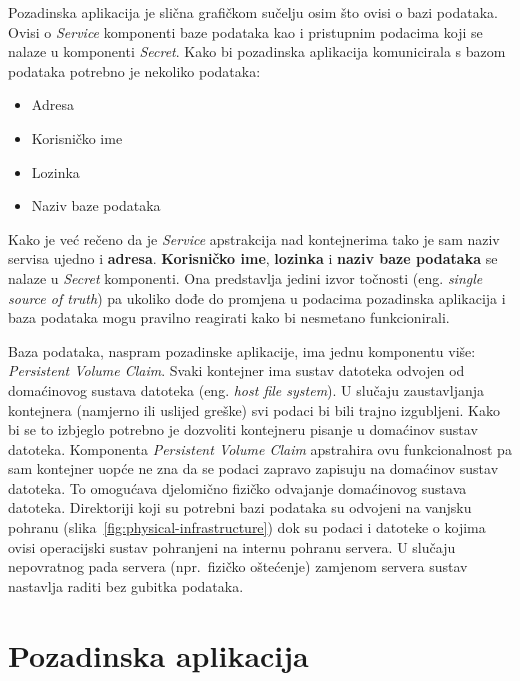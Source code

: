 Pozadinska aplikacija je slična grafičkom sučelju osim što ovisi o bazi podataka.
Ovisi o \textit{Service} komponenti baze podataka kao i pristupnim podacima koji se nalaze u komponenti \textit{Secret}.
Kako bi pozadinska aplikacija komunicirala s bazom podataka potrebno je nekoliko podataka:
\begin{itemize}
    \item Adresa
    \item Korisničko ime
    \item Lozinka
    \item Naziv baze podataka
\end{itemize}

Kako je već rečeno da je \textit{Service} apstrakcija nad kontejnerima tako je sam naziv servisa ujedno i \textbf{adresa}.
\textbf{Korisničko ime}, \textbf{lozinka} i \textbf{naziv baze podataka} se nalaze u \textit{Secret} komponenti.
Ona predstavlja jedini izvor točnosti (eng. \textit{single source of truth}) pa ukoliko dođe do promjena
u podacima pozadinska aplikacija i baza podataka mogu pravilno reagirati kako bi nesmetano funkcionirali.

Baza podataka, naspram pozadinske aplikacije, ima jednu komponentu više: \textit{Persistent Volume Claim}.
Svaki kontejner ima sustav datoteka odvojen od domaćinovog sustava datoteka (eng. \textit{host file system}).
U slučaju zaustavljanja kontejnera (namjerno ili uslijed greške) svi podaci bi bili trajno izgubljeni.
Kako bi se to izbjeglo potrebno je dozvoliti kontejneru pisanje u domaćinov sustav datoteka.
Komponenta \textit{Persistent Volume Claim} apstrahira ovu funkcionalnost pa sam kontejner uopće ne zna da se podaci zapravo
zapisuju na domaćinov sustav datoteka.
To omogućava djelomično fizičko odvajanje domaćinovog sustava datoteka.
Direktoriji koji su potrebni bazi podataka su odvojeni na vanjsku pohranu (slika~\ref{fig:physical-infrastructure}) dok su
podaci i datoteke o kojima ovisi operacijski sustav pohranjeni na internu pohranu servera.
U slučaju nepovratnog pada servera (npr.~fizičko oštećenje) zamjenom servera sustav nastavlja raditi bez gubitka podataka.

\section{Pozadinska aplikacija}


